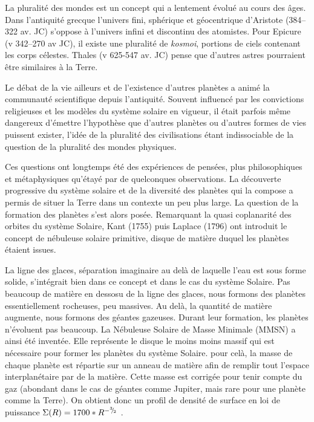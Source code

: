 


La pluralité des mondes est un concept qui a lentement évolué au cours des âges. Dans l'antiquité grecque l'univers fini, sphérique et géocentrique d'Aristote (384--322 av. JC) s'oppose à l'univers infini et discontinu des atomistes. Pour Epicure (v 342--270 av JC), il existe une pluralité de \textit{kosmoi}, portions de ciels contenant les corps célestes. Thales (v 625-547 av. JC) pense que d'autres astres pourraient être similaires à la Terre. 

Le débat de la vie ailleurs et de l'existence d'autres planètes a animé la communauté scientifique depuis l'antiquité. Souvent influencé par les convictions religieuses et les modèles du système solaire en vigueur, il était parfois même dangereux d'émettre l'hypothèse que d'autres planètes ou d'autres formes de vies puissent exister, l'idée de la pluralité des civilisations étant indissociable de la question de la pluralité des mondes physiques. 

Ces questions ont longtemps été des expériences de pensées, plus philosophiques et métaphysiques qu'étayé par de quelconques observations. La découverte progressive du système solaire et de la diversité des planètes qui la compose a permis de situer la Terre dans un contexte un peu plus large. La question de la formation des planètes s'est alors posée. Remarquant la quasi coplanarité des orbites du système Solaire, Kant (1755) puis Laplace (1796) ont introduit le concept de nébuleuse solaire primitive, disque de matière duquel les planètes étaient issues. 

La ligne des glaces, séparation imaginaire au delà de laquelle l'eau est sous forme solide, s'intégrait bien dans ce concept et dans le cas du système Solaire. Pas beaucoup de matière en dessosu de la ligne des glaces, nous formons des planètes essentiellement rocheuses, peu massives. Au delà, la quantité de matière augmente, nous formons des géantes gazeuses. Durant leur formation, les planètes n'évoluent pas beaucoup. La Nébuleuse Solaire de Masse Minimale (MMSN) a ainsi été inventée. Elle représente le disque le moins moins massif qui est nécessaire pour former les planètes du système Solaire. pour celà, la masse de chaque planète est répartie sur un anneau de matière afin de remplir tout l'espace interplanétaire par de la matière. Cette masse est corrigée pour tenir compte du gaz (abondant dans le cas de géantes comme Jupiter, mais rare pour une planète comme la Terre). On obtient donc un profil de densité de surface en loi de puissance $\Sigma(R)=1700 * R^{-{{}^{3\!\!}/ _{\!2}}}$ \citep{weidenschilling1977distribution, hayashi1981structure}.

